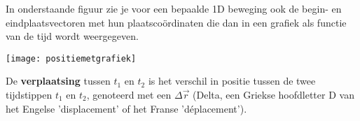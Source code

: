 \documentclass{ximera}
\begin{document}
\begin{image}
\end{image}



In onderstaande figuur zie je voor een bepaalde 1D beweging ook de begin- en eindplaatsvectoren met hun plaatscoördinaten die dan in een grafiek als functie van de tijd wordt weergegeven.

\begin{image}
\texttt{[image: positiemetgrafiek]}

\end{image}


De \textbf{verplaatsing} tussen $t_1$ en $t_2$ is het verschil in positie tussen de twee tijdstippen $t_1$ en $t_2$, genoteerd met een $\Delta$\(\vec{r}\) (Delta, een Griekse hoofdletter D  van het Engelse 'displacement' of het Franse 'déplacement').
\end{document}
